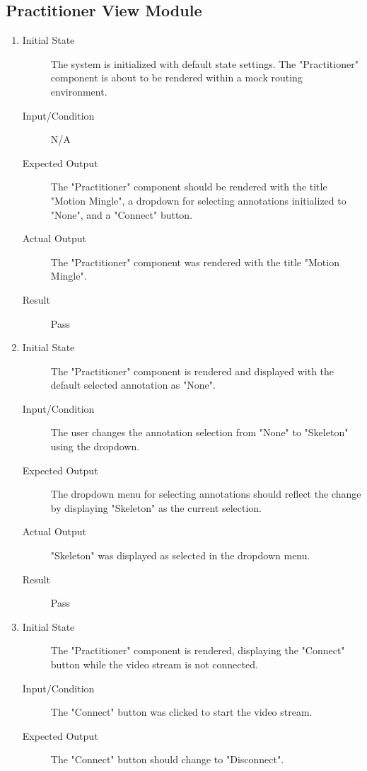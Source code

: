 \documentclass[12pt, titlepage]{article}
\begin{document}
\subsection{Practitioner View Module}
\begin{enumerate}[UT-PV1]
  \item \label{UT-PV1}
    \begin{description}
    \item[Initial State] The system is initialized with default state settings. The "Practitioner" component is about to be rendered within a mock routing environment.
    \item[Input/Condition] N/A
    \item[Expected Output] The "Practitioner" component should be rendered with the title "Motion Mingle", a dropdown for selecting annotations initialized to "None", and a "Connect" button.
    \item[Actual Output] The "Practitioner" component was rendered with the title "Motion Mingle".
    \item[Result] Pass
    \end{description}
  \item \label{UT-PV2}
    \begin{description}
    \item[Initial State] The "Practitioner" component is rendered and displayed with the default selected annotation as "None".
    \item[Input/Condition] The user changes the annotation selection from "None" to "Skeleton" using the dropdown.
    \item[Expected Output] The dropdown menu for selecting annotations should reflect the change by displaying "Skeleton" as the current selection.
    \item[Actual Output] "Skeleton" was displayed as selected in the dropdown menu.
    \item[Result] Pass
    \end{description}
  \item \label{UT-PV3}
    \begin{description}
    \item[Initial State] The "Practitioner" component is rendered, displaying the "Connect" button while the video stream is not connected.
    \item[Input/Condition] The "Connect" button was clicked to start the video stream.
    \item[Expected Output] The "Connect" button should change to "Disconnect".

\end{description}
\end{enumerate}
\end{document}
